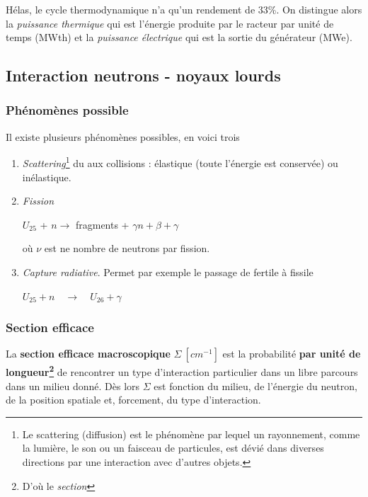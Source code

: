 Hélas, le cycle thermodynamique n'a qu'un rendement de 33\%. On distingue alors la \textit{puissance 
thermique} qui est l'énergie produite par le racteur par unité de temps (MWth) et la \textit{
puissance électrique} qui est la sortie du générateur (MWe).


\subsection{Interaction neutrons - noyaux lourds}
\subsubsection{Phénomènes possible}
Il existe plusieurs phénomènes possibles, en voici trois
\begin{enumerate}
\item \textit{Scattering}\footnote{Le scattering (diffusion) est le phénomène par lequel un rayonnement, comme la lumière, le son ou un faisceau de particules, est dévié dans diverses directions par une interaction avec d'autres objets.} du aux collisions : élastique (toute l'énergie est conservée) ou inélastique.
\item \textit{Fission}
\begin{center}
$U_{25}$ + $n$\quad$\to$ fragments + $\gamma n + \beta + \gamma$
\end{center}
où $\nu$ est ne nombre de neutrons par fission.
\item \textit{Capture radiative}. Permet par exemple le passage de fertile à fissile
\begin{center}
$U_{25} + n\quad\to\quad U_{26}+\gamma$
\end{center}
\end{enumerate}



\subsubsection{Section efficace}
La \textbf{section efficace macroscopique} $\Sigma\ [cm^{-1}]$ est la probabilité \textbf{par unité de 
longueur\footnote{D'où le \textit{section}}} de rencontrer un type d'interaction  particulier 
dans un libre parcours dans un milieu donné. Dès lors $\Sigma$ est fonction du milieu, de 
l'énergie du neutron, de la position spatiale et, forcement, du type d'interaction.

